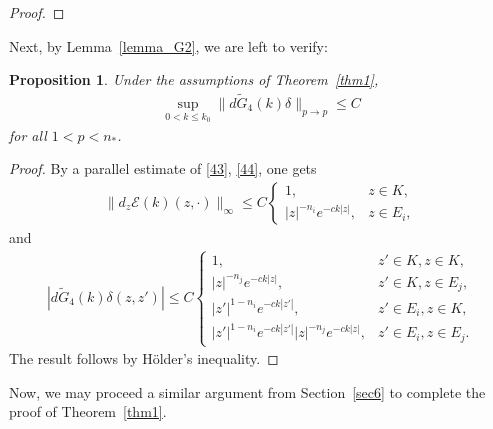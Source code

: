 \documentclass[12pt]{amsart}
\newtheorem{proposition}[theorem]{Proposition}
\begin{document}
\begin{proof}
\end{proof}


\medskip

Next, by Lemma~\ref{lemma_G2}, we are left to verify: 

\begin{proposition}\label{prop_alter2}
Under the assumptions of Theorem~\ref{thm1}, 
\begin{align*}
    \sup_{0<k\le k_0} \| d \tilde{G}_4(k) \delta \|_{p\to p} \le C
\end{align*}
for all $1<p<n_*$.
\end{proposition}

\begin{proof}
By a parallel estimate of \eqref{43}, \eqref{44}, one gets
\begin{align}
     \| d_{z}\mathcal{E}(k)(z, \cdot)\|_\infty \le C \begin{cases}
         1, & z\in K,\\
        |z|^{-n_i} e^{-ck|z|}, & z\in E_i,
     \end{cases}
\end{align}
and
\begin{align}
    |d\tilde{G}_4(k)\delta (z,z')| \le C \begin{cases}
        1, & z'\in K, z\in K,\\
        |z|^{-n_j} e^{-ck|z|}, & z'\in K, z\in E_j,\\
        |z'|^{1-n_i} e^{-ck|z'|}, & z'\in E_i, z\in K,\\
        |z'|^{1-n_i} e^{-ck|z'|} |z|^{-n_j} e^{-ck|z|}, & z'\in E_i, z\in E_j.
    \end{cases}
\end{align}
The result follows by Hölder's inequality.
\end{proof}

Now, we may proceed a similar argument from Section~\ref{sec6} to complete the proof of Theorem~\ref{thm1}.
\end{document}
